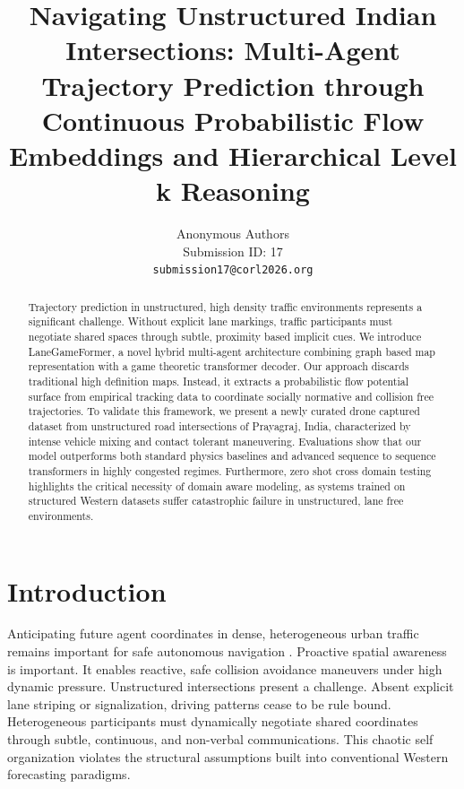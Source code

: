 \documentclass{article}
\begin{document}
\title{Navigating Unstructured Indian Intersections: Multi-Agent Trajectory Prediction through Continuous Probabilistic Flow Embeddings and Hierarchical Level k Reasoning}

\author{
  Anonymous Authors \\
  Submission ID: 17 \\
  \texttt{submission17@corl2026.org}
}

\maketitle

\begin{abstract}
Trajectory prediction in unstructured, high density traffic environments represents a significant challenge. Without explicit lane markings, traffic participants must negotiate shared spaces through subtle, proximity based implicit cues. We introduce LaneGameFormer, a novel hybrid multi-agent architecture combining graph based map representation with a game theoretic transformer decoder. Our approach discards traditional high definition maps. Instead, it extracts a probabilistic flow potential surface from empirical tracking data to coordinate socially normative and collision free trajectories. To validate this framework, we present a newly curated drone captured dataset from unstructured road intersections of Prayagraj, India, characterized by intense vehicle mixing and contact tolerant maneuvering. Evaluations show that our model outperforms both standard physics baselines and advanced sequence to sequence transformers in highly congested regimes. Furthermore, zero shot cross domain testing highlights the critical necessity of domain aware modeling, as systems trained on structured Western datasets suffer catastrophic failure in unstructured, lane free environments.
\end{abstract}


\section{Introduction}
Anticipating future agent coordinates in dense, heterogeneous urban traffic remains important for safe autonomous navigation \cite{b1, b2}. Proactive spatial awareness is important. It enables reactive, safe collision avoidance maneuvers under high dynamic pressure. Unstructured intersections present a challenge. Absent explicit lane striping or signalization, driving patterns cease to be rule bound. Heterogeneous participants must dynamically negotiate shared coordinates through subtle, continuous, and non-verbal communications. This chaotic self organization violates the structural assumptions built into conventional Western forecasting paradigms.
\end{document}
